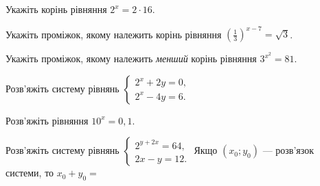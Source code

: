 \documentclass[12pt]{article}
\begin{document}
\begin{samepage}
\noindent\zadnum Укажіть корінь рівняння $2^x = 2 \cdot 16$. 

\nmtnobreak
{}
\par{}
\end{samepage}

\begin{samepage}
\noindent\zadnum Укажіть проміжок, якому належить корінь рівняння $\left(\displaystyle\frac{1}{3}\right)^{x-7} = \sqrt{3}$. 

\nmtnobreak
\answerTable{$(7; 10]$}{$(-4; 4)$}{$(-6; -4]$}{$(4; 7]$}{$[-7; -6]$}
\par{}
\end{samepage}

\begin{samepage}
\noindent\zadnum Укажіть проміжок, якому належить \textit{менший} корінь рівняння $3^{x^2} = 81$. 

\nmtnobreak
\answerTable{$[-2; 0)$}{$(2; +\infty)$}{$[-3; -2)$}{$[0; 2)$}{$(-\infty; -3)$}
\par{}
\end{samepage}

\begin{samepage}
\noindent\zadnum Розв'яжіть систему рівнянь $\begin{cases} 2^x + 2y = 0, \\ 2^x - 4y = 6. \end{cases}$ 

\nmtnobreak
{}
\par{}
\end{samepage}

\begin{samepage}
\noindent\zadnum Розв'яжіть рівняння $10^x = 0{,}1$. 

\nmtnobreak
{}

\nmtnobreak
\par{}\vspace{0.25cm}
\end{samepage}

\begin{samepage}
\noindent\zadnum Розв'яжіть систему рівнянь $\begin{cases} 2^{y+2x} = 64, \\ 2x - y = 12. \end{cases}$ Якщо $(x_0; y_0)$ --- розв'язок системи, то $x_0 + y_0 =$ 

\nmtnobreak
{}
\par{}
\end{samepage}
\end{document}
